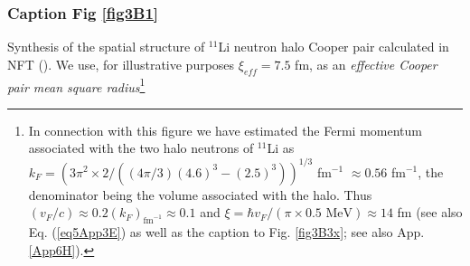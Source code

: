 \subsubsection{Caption Fig \ref{fig3B1}}
         Synthesis of the spatial structure of $^{11}$Li neutron halo Cooper pair calculated in NFT (\cite{Barranco:01}). We use, for illustrative purposes $\xi_{eff}=7.5$ fm, as an \textit{effective Cooper pair mean square radius}\footnote{In connection with this figure we have estimated the Fermi momentum associated with the two halo neutrons of $^{11}$Li as $k_F=(3\pi^2\times2/((4\pi/3)(4.6)^3-(2.5)^3))^{1/3}$ fm$^{-1}$ $\approx0.56$ fm$^{-1}$, the denominator being the volume associated with the halo. Thus $(v_F/c)\approx0.2(k_F)_{\text{fm}^{-1}}\approx 0.1$ and $\xi=\hbar v_F/(\pi\times0.5\text{ MeV})\approx 14$ fm (see also Eq. (\ref{eq5App3E}) as well as the  caption to Fig. \ref{fig3B3x}; see also App. \ref{App6H}).
         	
}
